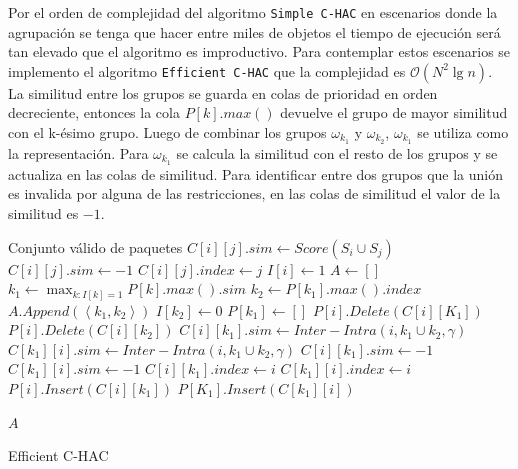 Por el orden de complejidad del algoritmo \texttt{Simple C-HAC}  en escenarios donde la agrupación se tenga que hacer entre miles de objetos el tiempo de ejecución será tan elevado que el algoritmo es improductivo. Para contemplar estos escenarios se implemento el algoritmo \texttt{Efficient C-HAC} que la complejidad es $\mathcal{O}(N^{2}\lg n)$. La similitud entre los grupos se guarda en colas de prioridad en orden decreciente, entonces la cola $P\left[k\right].max()$ devuelve el grupo de mayor similitud con el k-ésimo grupo. Luego de combinar los grupos $\omega_{k_{1}}$ y $\omega_{k_{2}}$, $\omega_{k_{1}}$ se utiliza como la representación. Para $\omega_{k_{1}}$ se calcula la similitud con el resto de los grupos y se actualiza en las colas de similitud. Para identificar entre dos grupos que la unión es invalida por alguna de las restricciones, en las colas de similitud el valor de la similitud es $-1$.

\begin{algorithm}[H]
\begin{algorithmic}[1]
\ENSURE Conjunto válido de paquetes
			\STATE $C[i][j].sim \leftarrow Score(S_i \cup S_j)$
		\ELSE
			\STATE $C[i][j].sim \leftarrow -1$
		\ENDIF
		\STATE $C[i][j].index \leftarrow j$
	\ENDFOR
	\STATE $I[i] \leftarrow 1$
\ENDFOR
\STATE $A \leftarrow []$
	\STATE $k_1 \leftarrow \max_{k:I[k]=1}{P[k].max().sim}$
		\BREAK
	\ENDIF
	\STATE $k_2 \leftarrow P[k_1].max().index$
	\STATE $A.Append(\left\langle k_1,k_2 \right\rangle)$
	\STATE $I[k_2] \leftarrow 0$
	\STATE $P[k_1] \leftarrow []$
		\STATE $P[i].Delete(C[i][K_1])$
		\STATE $P[i].Delete(C[i][k_2])$
			\STATE $C[i][k_1].sim \leftarrow Inter-Intra(i,k_1 \cup k_2,\gamma)$
			\STATE $C[k_1][i].sim \leftarrow Inter-Intra(i,k_1 \cup k_2,\gamma)$
		\ELSE
			\STATE $C[i][k_1].sim \leftarrow -1$
			\STATE $C[k_1][i].sim \leftarrow -1$
		\ENDIF
		\STATE $C[i][k_1].index \leftarrow i$
		\STATE $C[k_1][i].index \leftarrow i$		
		\STATE $P[i].Insert(C[i][k_1])$
		\STATE $P[K_1].Insert(C[k_1][i])$		
	\ENDFOR
\ENDFOR

\RETURN $A$
\end{algorithmic}
\caption{Efficient C-HAC}\label{alg:Efficient C-HAC}
\end{algorithm}

